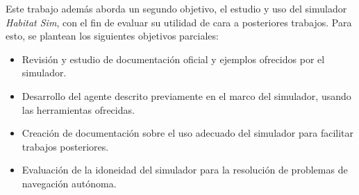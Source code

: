 Este trabajo además aborda un segundo objetivo, el estudio y uso del simulador \textit{Habitat Sim}, con el fin de evaluar su utilidad de cara a posteriores trabajos. Para esto, se plantean los siguientes objetivos parciales:

\begin{itemize}
	\item Revisión y estudio de documentación oficial y ejemplos ofrecidos por el simulador.
	\item Desarrollo del agente descrito previamente en el marco del simulador, usando las herramientas ofrecidas.
	\item Creación de documentación sobre el uso adecuado del simulador para facilitar trabajos posteriores.
	\item Evaluación de la idoneidad del simulador para la resolución de problemas de navegación autónoma.
\end{itemize}